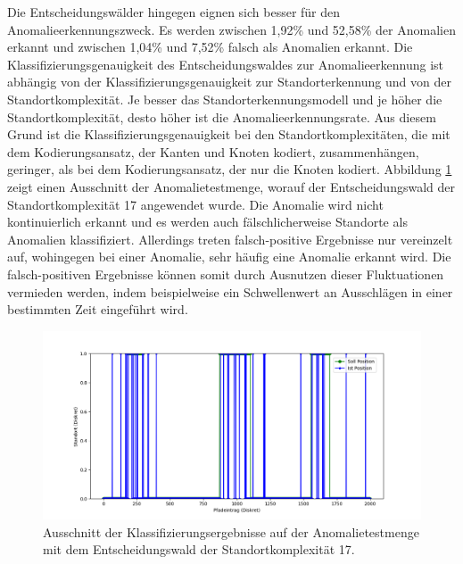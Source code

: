 \newpage
Die Entscheidungswälder hingegen eignen sich besser für den Anomalieerkennungszweck.
Es werden zwischen 1,92\% und 52,58\% der Anomalien erkannt und zwischen 1,04\% und 7,52\% falsch als Anomalien erkannt.
Die Klassifizierungsgenauigkeit des Entscheidungswaldes zur Anomalieerkennung ist abhängig von der Klassifizierungsgenauigkeit zur Standorterkennung
und von der Standortkomplexität.
Je besser das Standorterkennungsmodell und je höher die Standortkomplexität, desto höher ist die Anomalieerkennungsrate.
Aus diesem Grund ist die Klassifizierungsgenauigkeit bei den Standortkomplexitäten, die mit dem Kodierungsansatz, der Kanten und Knoten kodiert, zusammenhängen,
geringer, als bei dem Kodierungsansatz, der nur die Knoten kodiert.
\newline
\newline
Abbildung \ref{fig:true_vs_predicted_anomaly} zeigt einen Ausschnitt der Anomalietestmenge, worauf der Entscheidungswald der Standortkomplexität 17 angewendet wurde.
Die Anomalie wird nicht kontinuierlich erkannt und es werden auch fälschlicherweise Standorte als Anomalien klassifiziert.
Allerdings treten falsch-positive Ergebnisse nur vereinzelt auf, wohingegen bei einer Anomalie, sehr häufig eine Anomalie erkannt wird.
Die falsch-positiven Ergebnisse können somit durch Ausnutzen dieser Fluktuationen vermieden werden,
indem beispielweise ein Schwellenwert an Ausschlägen in einer bestimmten Zeit eingeführt wird.
\begin{figure}[h!]
    \centering
    \includegraphics[width=\linewidth]{images/anomaly_true_vs_predicted.png}
    \caption{Ausschnitt der Klassifizierungsergebnisse auf der Anomalietestmenge mit dem Entscheidungswald der Standortkomplexität 17. }
    \label{fig:true_vs_predicted_anomaly}
\end{figure}